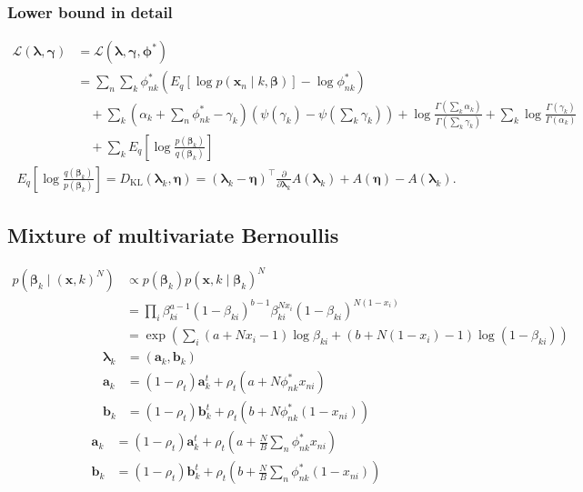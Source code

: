 \documentclass[a4paper]{article}
\begin{document}
		\subsubsection*{Lower bound in detail}
		\begin{align}
			\mathcal{L}(\bm{\lambda}, \bm{\gamma})
			&= \mathcal{L}(\bm{\lambda}, \bm{\gamma}, \bm{\phi}^*) \\
			&= \sum_n \sum_k \phi^*_{nk} \left( E_q\left[ \log p(\mathbf{x}_n \mid k, \bm{\beta}) \right]
			- \log \phi_{nk}^* \right) \\
			&\quad + \sum_k \left(\alpha_k + \sum_n \phi^*_{nk} - \gamma_k\right) \left( \psi(\gamma_k) - \psi\left(\sum_k \gamma_k\right) \right) + \log \frac{\Gamma\left(\sum_k \alpha_k\right)}{\Gamma\left(\sum_k \gamma_k\right)}
			+ \sum_k \log \frac{\Gamma(\gamma_k)}{\Gamma(\alpha_k)} \\
			&\quad + \sum_k E_q\left[ \log\frac{p(\bm{\beta}_k)}{q(\bm{\beta}_k)} \right]
		\end{align}
		\begin{align}
			E_q\left[ \log\frac{q(\bm{\beta}_k)}{p(\bm{\beta}_k)} \right]
			= D_\text{KL}\left(  \bm{\lambda}_k, \bm{\eta} \right) 
			= (\bm{\lambda}_k - \bm{\eta})^\top \frac{\partial}{\partial \bm{\lambda}_k} A(\bm{\lambda}_k)
			+ A(\bm{\eta}) - A(\bm{\lambda}_k).
		\end{align}

		\subsection*{Mixture of multivariate Bernoullis}
			\begin{align}
				p(\bm{\beta}_k \mid (\mathbf{x}, k)^N )
				&\propto p(\bm{\beta}_k) p(\mathbf{x}, k \mid \bm{\beta}_k)^N \\
				&= \prod_i \beta_{ki}^{a - 1}(1 - \beta_{ki})^{b - 1} \beta_{ki}^{Nx_i} (1 - \beta_{ki})^{N(1 - x_i)} \\
				&= \exp\left( \sum_i (a + N x_i - 1) \log \beta_{ki} + (b + N(1 - x_i) - 1) \log(1 - \beta_{ki}) \right)
			\end{align}
			\begin{align}
				\bm{\lambda}_k &= (\mathbf{a}_k, \mathbf{b}_k) \\
				\mathbf{a}_k &= (1 - \rho_t) \mathbf{a}_k^t + \rho_t (a + N \phi_{nk}^* x_{ni}) \\
				\mathbf{b}_k &= (1 - \rho_t) \mathbf{b}_k^t + \rho_t (b + N \phi_{nk}^* (1 - x_{ni}))
			\end{align}
			\begin{align}
				\mathbf{a}_k &= (1 - \rho_t) \mathbf{a}_k^t + \rho_t \left(a + \frac{N}{B} \sum_n \phi_{nk}^* x_{ni}\right) \\
				\mathbf{b}_k &= (1 - \rho_t) \mathbf{b}_k^t + \rho_t \left(b + \frac{N}{B} \sum_n \phi_{nk}^* (1 - x_{ni})\right)
			\end{align}
\end{document}
